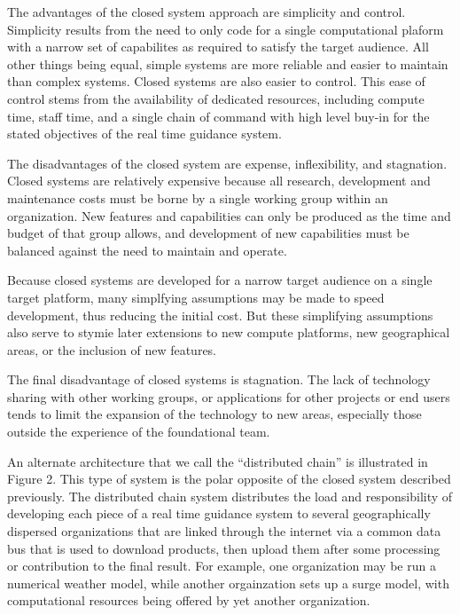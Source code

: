 \documentclass[12pt]{article}
\begin{document}
The advantages of the closed system approach are simplicity and 
control. Simplicity results from the need to only code for a single 
computational plaform with a narrow set of capabilites as required 
to satisfy the target audience. All other things being equal, simple 
systems are more reliable and easier to maintain than complex 
systems. Closed systems are also easier to control. This ease of 
control stems from the availability of dedicated resources, 
including compute time, staff time, and a single chain of command 
with high level buy-in for the stated objectives of the real time 
guidance system.

The disadvantages of the closed system are expense, inflexibility, 
and stagnation. Closed systems are relatively expensive because all 
research, development and maintenance costs must be borne by a 
single working group within an organization. New features and 
capabilities can only be produced as the time and budget of that 
group allows, and development of new capabilities must be balanced 
against the need to maintain and operate.

Because closed systems are developed for a narrow target audience on 
a single target platform, many simplfying assumptions may be made to 
speed development, thus reducing the initial cost. But these 
simplifying assumptions also serve to stymie later extensions to new 
compute platforms, new geographical areas, or the inclusion of new 
features. 

The final disadvantage of closed systems is stagnation. The lack of 
technology sharing with other working groups, or applications for 
other projects or end users tends to limit the expansion of the 
technology to new areas, especially those outside the experience of 
the foundational team. 

An alternate architecture that we call the ``distributed chain'' is 
illustrated in Figure 2. This type of system is the polar opposite 
of the closed system described previously. The distributed chain 
system distributes the load and responsibility of developing each 
piece of a real time guidance system to several geographically 
dispersed organizations that are linked through the internet via a 
common data bus that is used to download products, then upload them 
after some processing or contribution to the final result. For 
example, one organization may be run a numerical weather model, 
while another orgainzation sets up a surge model, with computational 
resources being offered by yet another organization. 
\end{document}
